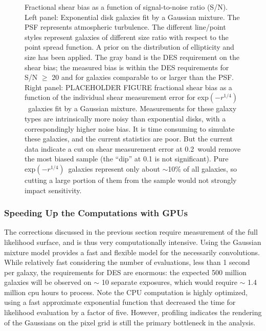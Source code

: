 \documentclass[12pt]{article}
\newcommand{\devprof}{exp$(-r^{1/4})$}
\newcommand{\errcut}{0.2}
\begin{document}
\begin{figure}[t]
\caption{Fractional shear bias as a function of signal-to-noise ratio (S/N).
Left panel: Exponential disk galaxies fit by a Gaussian mixture.  The PSF
represents atmospheric turbulence.  The different line/point styles represent
galaxies of different size ratio with respect to the point spread function.  A
prior on the distribution of ellipticity and size has been applied.  The gray
band is the DES requirement on the shear bias; the measured bias is within the
DES requirements for S/N $\geq$ 20 and for galaxies comparable to or larger
than the PSF.  Right panel: PLACEHOLDER FIGURE fractional shear bias as a
function of the individual shear measurement error for \devprof\ galaxies fit
by a Gaussian mixture.  Measurements for these galaxy types are intrinsically
more noisy than exponential disks, with a correspondingly higher noise bias. It
is time consuming to simulate these galaxies, and the current statistics are
poor. But the current data indicate a cut on shear measurement error at
\errcut\ would remove the most biased sample (the ``dip'' at 0.1 is not
significant).  Pure \devprof\ galaxies represent only about $\sim$10\% of all
galaxies, so cutting a large portion of them from the sample would not strongly
impact sensitivity.  \label{fig:getgdt}}

\end{figure}

\subsubsection{Speeding Up the Computations with GPUs} \label{sec:gmix:gpu}

The corrections discussed in the previous section require measurement of the
full likelihood surface, and is thus very computationally intensive.  Using the
Gaussian mixture model provides a fast and flexible model for the necessarily
convolutions.   While relatively fast considering the number of evaluations,
less than 1 second per galaxy, the requirements for DES are enormous: the
expected 500 million galaxies will be observed on $\sim$ 10 separate exposures,
which would require $\sim$ 1.4 million cpu hours to process. Note the CPU
computation is highly optimized, using a fast approximate exponential function
that decreased the time for likelihood evaluation by a factor of five.
However, profiling indicates the rendering of the Gaussians on the pixel grid
is still the primary bottleneck in the analysis.
\end{document}
